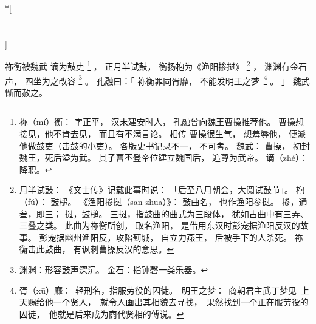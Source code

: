 
\switchcolumn[0]*[\section{}]

祢衡被魏武
谪为鼓吏%
\footnote{%
    祢（mí）衡：
        字正平，
        汉末建安时人，
        孔融曾向魏王曹操推荐他。
        曹操想接见，他不肯去见，
        而且有不满言论。
        相传
        曹操很生气，
        想羞辱他，
        便派他做鼓吏（击鼓的小吏）。
        各版史书记录不一，
        不可考。
    魏武：
        曹操，
        初封魏王，死后溢为武。
        其子曹丕登帝位建立魏国后，
        追尊为武帝。
    谪（zhé）：降职。
}%
，
正月半试鼓，
衡扬枹为《渔阳掺挝》%
\footnote{%
    月半试鼓：
        《文士传》记载此事时说：
        「后至八月朝会，大阅试鼓节」。
    枹（fú）：
        鼓槌。
    《渔阳掺挝（sān zhuā）》：
        鼓曲名，
        也作渔阳参挝。
        掺，通叁，即三；
        挝，鼓槌。
        三挝，指鼓曲的曲式为三段体，
        犹如古曲中有三弄、三叠之类。
        此曲为祢衡所创，
        取名渔阳，
        是借用东汉时彭宠据渔阳反汉的故事。
        彭宠据幽州渔阳反，攻陷蓟城，
        自立力燕王，
        后被手下的人杀死。
        祢衡击此鼓曲，
        有讽刺曹操反汉的意思。
}%
，
渊渊有金石声，
四坐为之改容%
\footnote{%
    渊渊：形容鼓声深沉。
    金石：指钟磬一类乐器。
}%
。
孔融曰：「
    祢衡罪同胥靡，
    不能发明王之\mbox{梦%
    \footnote{%
        胥（xū）靡：
            轻刑名，指服劳役的囚徒。
        明王之梦：
            商朝君主武丁梦见
            上天赐给他一个贤人，
            就令人画出其相貌去寻找，
            果然找到一个正在服劳役的囚徒，
            他就是后来成为商代贤相的傅说。
    }}%
    。
」
魏武惭而赦之。

\switchcolumn


